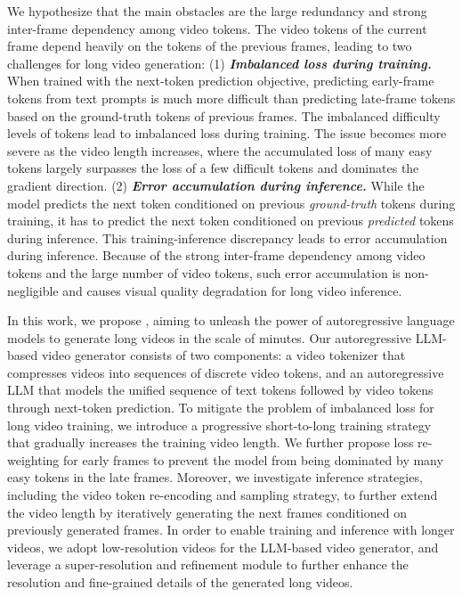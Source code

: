 We hypothesize that the main obstacles are the large redundancy and strong inter-frame dependency among video tokens.
The video tokens of the current frame depend heavily on the tokens of the previous frames, leading to two challenges for long video generation:
(1) \textbf{\textit{Imbalanced loss during training.}} When trained with the next-token prediction objective, predicting early-frame tokens from text prompts is much more difficult than predicting late-frame tokens based on the ground-truth tokens of previous frames. The imbalanced difficulty levels of tokens lead to imbalanced loss during training. The issue becomes more severe as the video length increases, where the accumulated loss of many easy tokens largely surpasses the loss of a few difficult tokens and dominates the gradient direction.
(2) \textbf{\textit{Error accumulation during inference.}} While the model predicts the next token conditioned on previous \textit{ground-truth} tokens during training, it has to predict the next token conditioned on previous \textit{predicted} tokens during inference. This training-inference discrepancy leads to error accumulation during inference. Because of the strong inter-frame dependency among video tokens and the large number of video tokens, such error accumulation is non-negligible and causes visual quality degradation for long video inference.


In this work, we propose \textbf{\ours}, aiming to unleash the power of autoregressive language models to generate long videos in the scale of minutes. 
Our autoregressive LLM-based video generator consists of two components: a video tokenizer that compresses videos into sequences of discrete video tokens, and an autoregressive LLM that models the unified sequence of text tokens followed by video tokens through next-token prediction.
To mitigate the problem of imbalanced loss for long video training, we introduce a progressive short-to-long training strategy that gradually increases the training video length. We further propose loss re-weighting for early frames to prevent the model from being dominated by many easy tokens in the late frames. Moreover, we investigate inference strategies, including the video token re-encoding and sampling strategy, to further extend the video length by iteratively generating the next frames conditioned on previously generated frames. In order to enable training and inference with longer videos, we adopt low-resolution videos for the LLM-based video generator, and leverage a super-resolution and refinement module to further enhance the resolution and fine-grained details of the generated long videos.





